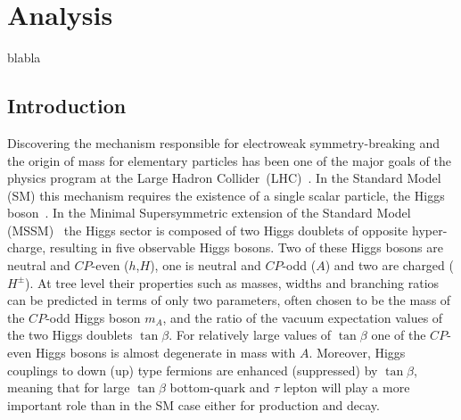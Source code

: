 \chapter{Analysis}
blabla
\section{Introduction} \label{sec:intro}

Discovering the mechanism responsible for electroweak
symmetry-breaking and the origin of mass for elementary particles has been
one of the major goals of the physics program at the Large Hadron
Collider~(LHC)~\cite{LHC}.  In the Standard Model (SM) this mechanism
requires the existence of a single scalar particle, the Higgs
boson~\cite{ENGLERT,HIGGS,HIGGS2,HIGGS3,Guralnik:1964eu}.
In the Minimal Supersymmetric extension of the Standard Model
(MSSM)~\cite{MSSM1, MSSM2} the Higgs sector is composed of two Higgs
doublets of opposite hyper-charge, resulting in five observable Higgs
bosons.  Two of these Higgs bosons are neutral and $CP$-even
($h$,$H$), one is neutral and $CP$-odd ($A$) and two are charged
($H^\pm$).  At tree level their properties such as masses, widths and
branching ratios can be predicted in terms of only two parameters,
often chosen to be the mass of the $CP$-odd Higgs boson $m_A$, and
the ratio of the vacuum expectation values of the two Higgs doublets
$\tan\beta$.  For relatively large values of $\tan\beta$ one of the
$CP$-even Higgs bosons is almost degenerate in mass with
$A$. Moreover, Higgs couplings to down (up) type fermions are enhanced
(suppressed) by $\tan\beta$, meaning that for large $\tan\beta$
bottom-quark and $\tau$ lepton will play a more important role than in
the SM case either for production and decay.


